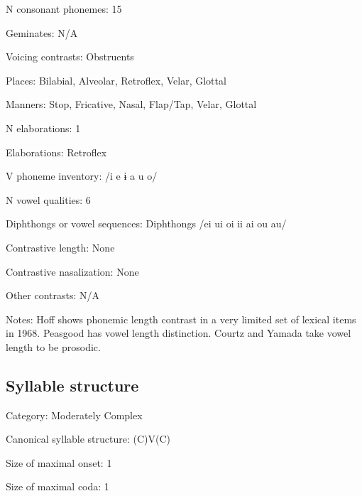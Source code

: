 {\begin{appendixdesc}
\item[N consonant phonemes:] 15

\item[Geminates:] N/A

\item[Voicing contrasts:] Obstruents

\item[Places:] Bilabial, Alveolar, Retroflex, Velar, Glottal

\item[Manners:] Stop, Fricative, Nasal, Flap/Tap, Velar, Glottal

\item[N elaborations:] 1

\item[Elaborations:] Retroflex

\item[V phoneme inventory:] /i e ɨ a u o/

\item[N vowel qualities:] 6

\item[Diphthongs or vowel sequences:] Diphthongs /ei ui oi ii ai ou au/

\item[Contrastive length:] None

\item[Contrastive nasalization:] None

\item[Other contrasts:] N/A

\item[Notes:] Hoff shows phonemic length contrast in a very limited set of lexical items in 1968. Peasgood has vowel length distinction. Courtz and Yamada take vowel length to be prosodic.
\end{appendixdesc}
\subsection*{Syllable structure}
\begin{appendixdesc}

\item[Category:] Moderately Complex

\item[Canonical syllable structure:] (C)V(C) \citep[22--27]{Courtz2008}

\item[Size of maximal onset:] 1

\item[Size of maximal coda:] 1


\end{appendixdesc}}
